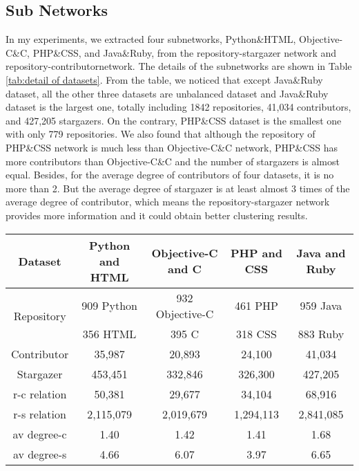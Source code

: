\documentclass[12pt,oneside,final]{vlsithesis}
\begin{document}
\subsection{Sub Networks}\label{section:sub networks}
In my experiments, we extracted four subnetworks, Python\&HTML, Objective-C\&C, PHP\&CSS, and Java\&Ruby, from the repository-stargazer network and repository-contributornetwork. The details of the subnetworks are shown in Table \ref{tab:detail of datasets}. From the table, we noticed that except Java\&Ruby dataset, all the other three datasets are unbalanced dataset and Java\&Ruby dataset is the largest one, totally  including 1842 repositories, 41,034 contributors, and 427,205 stargazers. On the contrary, PHP\&CSS dataset is the smallest one with only 779 repositories. We also found that although the repository of PHP\&CSS network is much less than Objective-C\&C network, PHP\&CSS has more contributors than Objective-C\&C and the number of stargazers is almost equal. Besides, for the average degree of contributors of four datasets, it is no more than 2. But the average degree of stargazer is at least almost 3 times of the average degree of contributor, which means the repository-stargazer network provides more information and it could obtain better clustering results. 
\begin{table*}
	\centering
	\begin{tabular}{c|cccc}\toprule
		Dataset & Python and HTML & Objective-C and C & PHP and CSS & Java and Ruby \\ \hline
		\multirow{2}{*}{Repository} & 909 Python& 932 Objective-C& 461 PHP & 959 Java \\ 
		& 356 HTML & 395 C & 318 CSS& 883 Ruby\\
		Contributor &  35,987 & 20,893 & 24,100 & 41,034 \\
		Stargazer & 453,451 &  332,846 & 326,300 & 427,205 \\
		r-c relation&  50,381 & 29,677 & 34,104 & 68,916 \\
		r-s relation &  2,115,079 &  2,019,679 & 1,294,113 & 2,841,085 \\ 
		av degree-c &  1.40 &  1.42 & 1.41 & 1.68 \\
		av degree-s &  4.66 &  6.07 & 3.97 & 6.65 \\ \bottomrule
	\end{tabular}
	\caption{Detail of Datasets, r-c relation means relation between repository and contributor, r-s relation means relation between repository and stargazer, av degree-c means average degree of contributors, av degree-s means average degree of stargazers}
	\label{tab:detail of datasets}
\end{table*}
\end{document}
